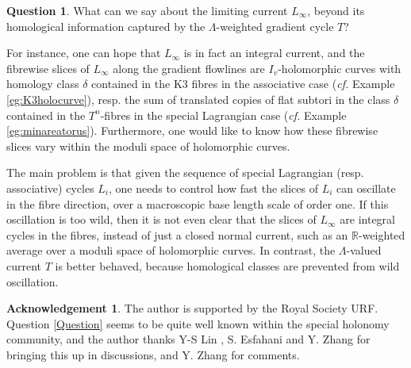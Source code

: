 \documentclass{article}
\theoremstyle{definition}
\newtheorem{Question}{Question}
\newtheorem*{Acknowledgement}{Acknowledgement}
\newcommand{\cf}{\emph{cf.} }
\newcommand{\R}{\mathbb{R}}
\begin{document}
		
		
		
		
		
		
		\begin{Question}
			What can we say about the limiting current $L_\infty$, beyond its homological information captured by the $\Lambda$-weighted gradient cycle $T$?
		\end{Question}
		
		
		
		
		
		
		
		For instance, one can hope that $L_\infty$ is in fact an integral current, and the fibrewise slices of $L_\infty$ along the gradient flowlines are $I_v$-holomorphic curves with homology class $\delta$ contained in the K3 fibres in the associative case (\cf Example \ref{eg:K3holocurve}), resp. the sum of translated copies of flat subtori in the class $\delta$ contained in the $T^n$-fibres in the special Lagrangian case (\cf Example \ref{eg:minareatorus}). Furthermore, one would like to know how these fibrewise slices vary within the moduli space of holomorphic curves.
		
		
		
		
The main problem is that given the sequence of special Lagrangian (resp. associative) cycles $L_i$, one needs to control how fast the slices of $L_i$ can oscillate in the fibre direction, over a macroscopic base length scale of order one.
If this oscillation is too wild, then it is not even clear that the slices of $L_\infty$ are integral cycles in the fibres, instead of just a closed normal current, such as an $\R$-weighted average over a moduli space of holomorphic curves. In contrast, the $\Lambda$-valued current $T$ is better behaved, because homological classes are prevented from wild oscillation.
		

		
		
		
		

		
		
		
		
		
		
		
		
		
		\begin{Acknowledgement}
			The author is supported by the Royal Society URF. 	Question \ref{Question} seems to be quite well known within the special holonomy community, and the author thanks Y-S Lin ,  S. Esfahani  and Y. Zhang for bringing this up in discussions, and Y. Zhang for comments. 
		\end{Acknowledgement}
		
\end{document}
